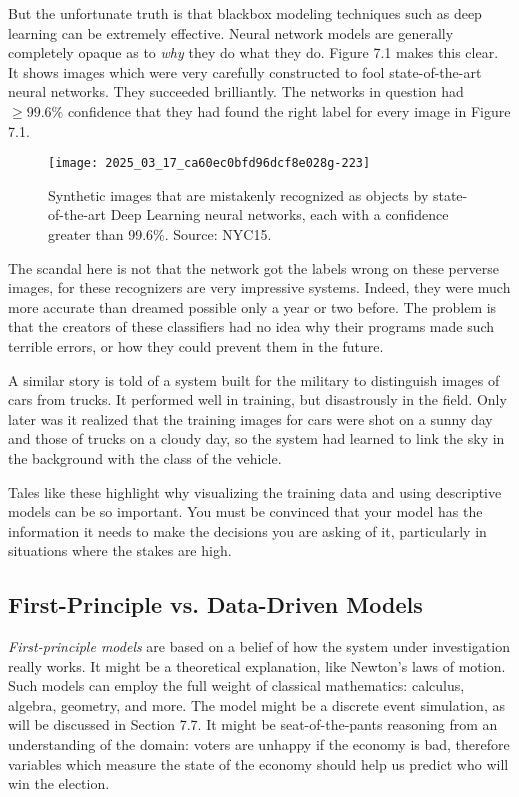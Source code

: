 \documentclass[10pt]{article}
\begin{document}
But the unfortunate truth is that blackbox modeling techniques such as deep learning can be extremely effective. Neural network models are generally completely opaque as to \textit{why} they do what they do. Figure 7.1 makes this clear. It shows images which were very carefully constructed to fool state-of-the-art neural networks. They succeeded brilliantly. The networks in question had \(\geq 99.6\%\) confidence that they had found the right label for every image in Figure 7.1.

\begin{figure}[h]
\centering
\texttt{[image: 2025\_03\_17\_ca60ec0bfd96dcf8e028g-223]}
\caption{Synthetic images that are mistakenly recognized as objects by state-of-the-art Deep Learning neural networks, each with a confidence greater than 99.6\%. Source: NYC15.}
\end{figure}

The scandal here is not that the network got the labels wrong on these perverse images, for these recognizers are very impressive systems. Indeed, they were much more accurate than dreamed possible only a year or two before. The problem is that the creators of these classifiers had no idea why their programs made such terrible errors, or how they could prevent them in the future.

A similar story is told of a system built for the military to distinguish images of cars from trucks. It performed well in training, but disastrously in the field. Only later was it realized that the training images for cars were shot on a sunny day and those of trucks on a cloudy day, so the system had learned to link the sky in the background with the class of the vehicle.

Tales like these highlight why visualizing the training data and using descriptive models can be so important. You must be convinced that your model has the information it needs to make the decisions you are asking of it, particularly in situations where the stakes are high.

\subsection{First-Principle vs. Data-Driven Models}

\textit{First-principle models} are based on a belief of how the system under investigation really works. It might be a theoretical explanation, like Newton’s laws of motion. Such models can employ the full weight of classical mathematics: calculus, algebra, geometry, and more. The model might be a discrete event simulation, as will be discussed in Section 7.7. It might be seat-of-the-pants reasoning from an understanding of the domain: voters are unhappy if the economy is bad, therefore variables which measure the state of the economy should help us predict who will win the election.
\end{document}
